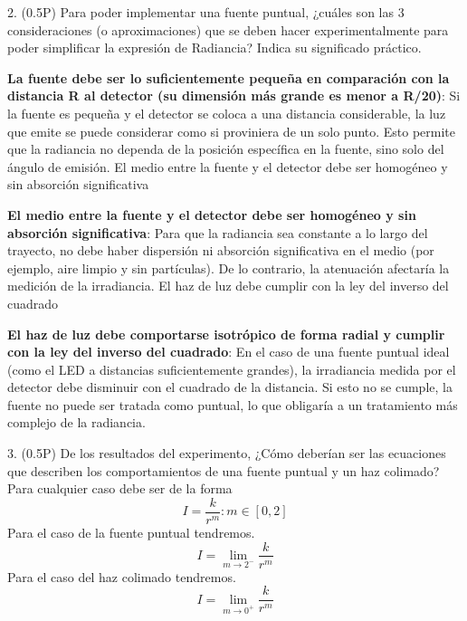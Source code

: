 \documentclass{article}
\theoremstyle{nonumberplain}
\begin{document}
2. (0.5P) Para poder implementar una fuente puntual, ¿cuáles son las 3 consideraciones (o aproximaciones) que se deben hacer experimentalmente para poder simplificar la expresión de Radiancia? Indica su significado práctico.

\textbf{La fuente debe ser lo suficientemente pequeña en comparación con la distancia R al detector (su dimensión más grande es menor a R/20)}: Si la fuente es pequeña y el detector se coloca a una distancia considerable, la luz que emite se puede considerar como si proviniera de un solo punto. Esto permite que la radiancia no dependa de la posición específica en la fuente, sino solo del ángulo de emisión.
El medio entre la fuente y el detector debe ser homogéneo y sin absorción significativa

\textbf{El medio entre la fuente y el detector debe ser homogéneo y sin absorción significativa}: Para que la radiancia sea constante a lo largo del trayecto, no debe haber dispersión ni absorción significativa en el medio (por ejemplo, aire limpio y sin partículas). De lo contrario, la atenuación afectaría la medición de la irradiancia.
El haz de luz debe cumplir con la ley del inverso del cuadrado

\textbf{El haz de luz debe comportarse isotrópico de forma radial y cumplir con la ley del inverso del cuadrado}: En el caso de una fuente puntual ideal (como el LED a distancias suficientemente grandes), la irradiancia medida por el detector debe disminuir con el cuadrado de la distancia. Si esto no se cumple, la fuente no puede ser tratada como puntual, lo que obligaría a un tratamiento más complejo de la radiancia.


3. (0.5P) De los resultados del experimento, ¿Cómo deberían ser las ecuaciones que describen los comportamientos de una fuente puntual y un haz colimado?
Para cualquier caso debe ser de la forma
$$ I=\frac{k}{r^m} : m\in[0,2] $$
Para el caso de la fuente puntual tendremos.
$$ I = \lim_{m \rightarrow 2^-} \frac{k}{r^m} $$
Para el caso del haz colimado tendremos.
$$ I = \lim_{m \rightarrow 0^+} \frac{k}{r^m} $$
\end{document}
